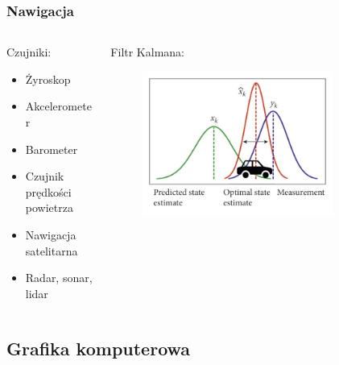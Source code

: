 \documentclass[aspectratio=169]{beamer}
\begin{document}
\begin{frame}%
	\frametitle{Nawigacja}
	\begin{columns}[T]
		\begin{column}{0.5\textwidth}
	   	 	 Czujniki:
	   	 	 \begin{itemize}
			  \item{
			    Żyroskop
			    \pause
			  }
			  \item {   
			    Akcelerometer
			    \pause
			  }
			  \item {   
			    Barometer
			    \pause
			  }
			  \item {   
			    Czujnik prędkości powietrza
			    \pause
			  }
			  \item {   
			    Nawigacja satelitarna
			    \pause
			  }
			  \item {   
			    Radar, sonar, lidar
			  }
	     \end{itemize}
	     \pause
	   	 	
		\end{column}
		\begin{column}{0.5\textwidth}
			Filtr Kalmana:
	   	 	\begin{figure}
	   		 \centering
	      		 \includegraphics[width=0.8\textwidth]{kalman.png}
	    		\end{figure}
		\end{column}
	\end{columns}
\end{frame}

\subsection{Grafika komputerowa}
\end{document}
